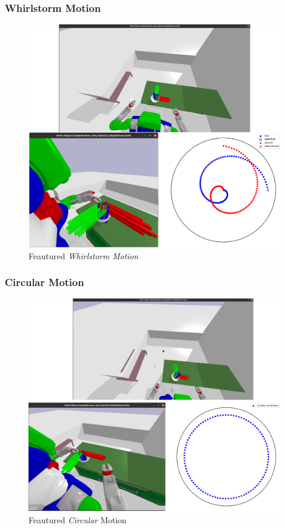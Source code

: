 \subsubsection{Whirlstorm Motion}

\begin{figure}[H]
    \centering
    \includegraphics[scale=0.27]{Graphics/whirlstorm_showcase.jpg}
    \caption{Feautured \textit{Whirlstorm Motion}}
    \label{fig:whirlstormshowcase}
\end{figure}



\subsubsection{Circular Motion}

\begin{figure}[H]
    \centering
    \includegraphics[scale=0.27]{Graphics/circular_showcase.jpg}
    \caption{Feautured \textit{Circular} Motion}
    \label{fig:circularshowcase}
\end{figure}


